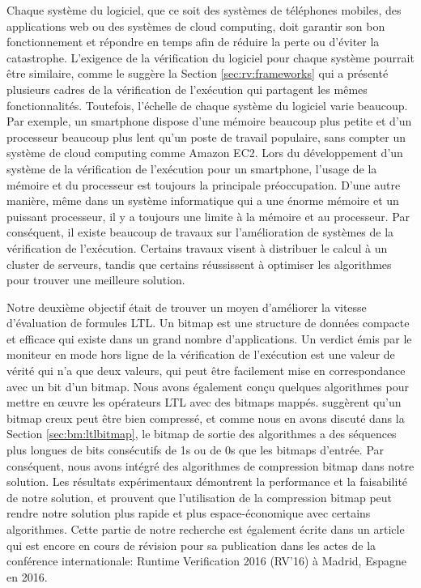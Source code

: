 Chaque système du logiciel, que ce soit des systèmes de téléphones mobiles, des applications web ou des systèmes de cloud computing, doit garantir son bon fonctionnement et répondre en temps afin de réduire la perte ou d'éviter la catastrophe. L'exigence de la vérification du logiciel pour chaque système pourrait être similaire, comme le suggère la Section \ref{sec:rv:frameworks} qui a présenté plusieurs cadres de la vérification de l'exécution qui partagent les mêmes fonctionnalités. Toutefois, l'échelle de chaque système du logiciel varie beaucoup. Par exemple, un smartphone dispose d'une mémoire beaucoup plus petite et d'un processeur beaucoup plus lent qu'un poste de travail populaire, sans compter un système de cloud computing comme Amazon EC2. Lors du développement d'un système de la vérification de l'exécution pour un smartphone, l'usage de la mémoire et du processeur est toujours la principale préoccupation. D'une autre manière, même dans un système informatique qui a une énorme mémoire et un puissant processeur, il y a toujours une limite à la mémoire et au processeur. Par conséquent, il existe beaucoup de travaux sur l'amélioration de systèmes de la vérification de l'exécution. Certains travaux visent à distribuer le calcul à un cluster de serveurs, tandis que certains réussissent à optimiser les algorithmes pour trouver une meilleure solution.

Notre deuxième objectif était de trouver un moyen d'améliorer la vitesse d'évaluation de formules LTL. Un bitmap est une structure de données compacte et efficace qui existe dans un grand nombre d'applications. Un verdict émis par le moniteur en mode hors ligne de la vérification de l'exécution est une valeur de vérité qui n'a que deux valeurs, qui peut être facilement mise en correspondance avec un bit d'un bitmap. Nous avons également conçu quelques algorithmes pour mettre en \oe{}uvre les opérateurs LTL avec des bitmaps mappés. \cite{lemire2014} suggèrent qu'un bitmap creux peut être bien compressé, et comme nous en avons discuté dans la Section \ref{sec:bm:ltlbitmap}, le bitmap de sortie des algorithmes a des séquences plus longues de bits consécutifs de 1s ou de 0s que les bitmaps d'entrée. Par conséquent, nous avons intégré des algorithmes de compression bitmap dans notre solution. Les résultats expérimentaux démontrent la performance et la faisabilité de notre solution, et prouvent que l'utilisation de la compression bitmap peut rendre notre solution plus rapide et plus espace-économique avec certains algorithmes. Cette partie de notre recherche est également écrite dans un article qui est encore en cours de révision pour sa publication dans les actes de la conférence internationale: Runtime Verification 2016 (RV'16) à Madrid, Espagne en 2016.

